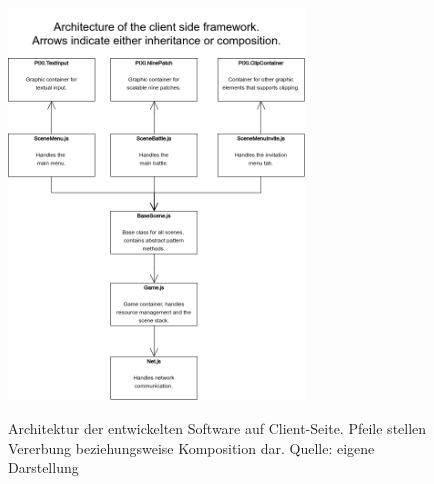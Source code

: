 \documentclass[ngerman,11pt]{report}
\begin{document}
\begin{figure}
\caption{Architektur der entwickelten Software auf Client-Seite. Pfeile stellen Vererbung beziehungsweise Komposition dar. Quelle: eigene Darstellung}
\centering
\includegraphics[width=0.7\textwidth]{ClientFramework}
\label{fig:clientarch}
\end{figure}

\MakeBibliography
\end{document}
